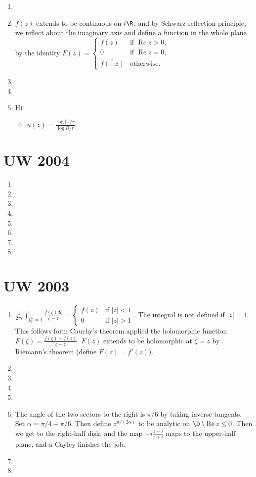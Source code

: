 \documentclass[11pt]{book}
\theoremstyle{definition}
\renewcommand{\Re}{\operatorname{Re}}
\begin{document}
\begin{enumerate}
\item
\item $f(z)$ extends to be continuous on $i\R$, and by Schwarz reflection principle, we reflect about the imaginary axis and define a function in the whole plane by the identity $F(z)=\begin{cases} f(z) & \text{if } \Re z > 0, \\ 0 & \text{if } \Re z = 0, \\ \overline{f(-\overline{z})} & \text{otherwise}.\end{cases}$
\item
\item
\item Hi
\begin{itemize}
\item $u(z)=\frac{\log{|z|/r}}{\log{R/r}}$.
\end{itemize}
\end{enumerate}
\section{UW 2004}
\begin{enumerate}
\item 
\item
\item
\item
\item 
\item
\item
\item
\end{enumerate}
\section{UW 2003}
\begin{enumerate}
\item $\frac{1}{2\pi i}\int_{|\zeta|=1} \frac{f(\zeta)d\zeta}{\zeta-z}=\begin{cases} f(z) &\text{if } |z|<1 \\ 0 & \text{if } |z| >1\end{cases}$. The integral is not defined if $|z|=1$. This follows form Cauchy's theorem applied the holomorphic function $F(\zeta)=\frac{f(\zeta)-f(z)}{\zeta-z}$. $F(z)$ extends to be holomorphic at $\zeta=z$ by Riemann's theorem (define $F(z)=f'(z)$).
\item
\item
\item
\item 
\item The angle of the two sectors to the right is $\pi/6$ by taking inverse tangents. Set $\alpha=\pi/4+\pi/6$. Then define $z^{\pi/(2\alpha)}$ to be analytic on $\D\setminus{\Re z\leq 0}$. Then we get to the right-half disk, and the map $-i\frac{z-i}{z+i}$ maps to the upper-half plane, and a Cayley finishes the job.
\item
\item
\end{enumerate}
\end{document}
